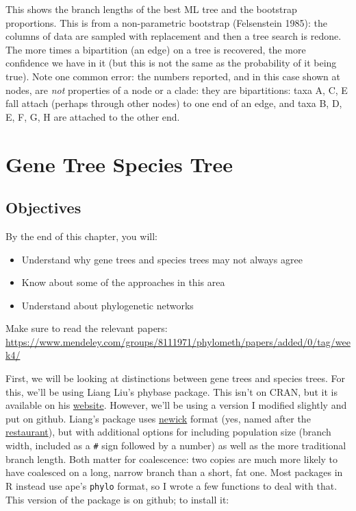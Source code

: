 \documentclass[]{book}
\providecommand{\tightlist}{%
  \setlength{\itemsep}{0pt}\setlength{\parskip}{0pt}}
\theoremstyle{definition}
\theoremstyle{definition}
\theoremstyle{remark}
\begin{document}
This shows the branch lengths of the best ML tree and the bootstrap
proportions. This is from a non-parametric bootstrap (Felsenstein 1985):
the columns of data are sampled with replacement and then a tree search
is redone. The more times a bipartition (an edge) on a tree is
recovered, the more confidence we have in it (but this is not the same
as the probability of it being true). Note one common error: the numbers
reported, and in this case shown at nodes, are \emph{not} properties of
a node or a clade: they are bipartitions: taxa A, C, E fall attach
(perhaps through other nodes) to one end of an edge, and taxa B, D, E,
F, G, H are attached to the other end.

\chapter{Gene Tree Species Tree}\label{gene-tree-species-tree}

\section{Objectives}\label{objectives-6}

By the end of this chapter, you will:

\begin{itemize}
\tightlist
\item
  Understand why gene trees and species trees may not always agree
\item
  Know about some of the approaches in this area
\item
  Understand about phylogenetic networks
\end{itemize}

Make sure to read the relevant papers:
\url{https://www.mendeley.com/groups/8111971/phylometh/papers/added/0/tag/week4/}

First, we will be looking at distinctions between gene trees and species
trees. For this, we'll be using Liang Liu's phybase package. This isn't
on CRAN, but it is available on his
\href{https://faculty.franklin.uga.edu/lliu/content/phybase?}{website}.
However, we'll be using a version I modified slightly and put on github.
Liang's package uses
\href{http://evolution.genetics.washington.edu/phylip/newicktree.html}{newick}
format (yes, named after the \href{http://newicks.com}{restaurant}), but
with additional options for including population size (branch width,
included as a \texttt{\#} sign followed by a number) as well as the more
traditional branch length. Both matter for coalescence: two copies are
much more likely to have coalesced on a long, narrow branch than a
short, fat one. Most packages in R instead use ape's \texttt{phylo}
format, so I wrote a few functions to deal with that. This version of
the package is on github; to install it:
\end{document}
